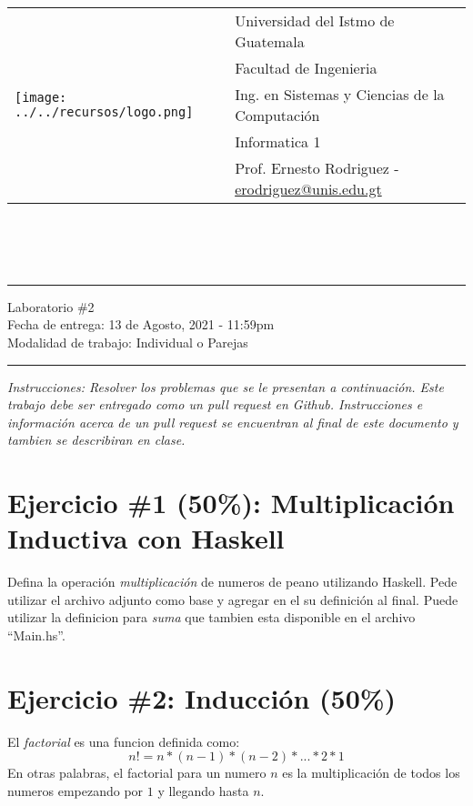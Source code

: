 \documentclass{article}
\newcommand{\horrule}[1]{\rule{\linewidth}{#1}}
\newcommand{\perlscript}[2]{
\begin{itemize}
\item[]
\end{itemize}
}
\begin{document}
\begin{tabular}{l l}
\multirow{5}{*}{\texttt{[image: ../../recursos/logo.png]}} & Universidad del Istmo de Guatemala \\
 & Facultad de Ingenieria \\
 & Ing. en Sistemas y Ciencias de la Computaci\'on \\
 & Informatica 1 \\
 & Prof. Ernesto Rodriguez - \href{mailto:erodriguez@unis.edu.gt}{erodriguez@unis.edu.gt} \\
\end{tabular}
\\\\\\

\begin{center}
        \horrule{0.5pt}
        \huge{Laboratorio \#2} \\
        \large{Fecha de entrega: 13 de Agosto, 2021 - 11:59pm} \\
        \large{Modalidad de trabajo: Individual o Parejas}
        \horrule{1pt}
\end{center}

\emph{Instrucciones: Resolver los problemas que se le presentan a
continuaci\'on. Este trabajo debe ser entregado como un pull request
en Github. Instrucciones e informaci\'on acerca de un pull request
se encuentran al final de este documento y tambien se describiran
en clase.}


\section*{Ejercicio \#1 (50\%): Multiplicaci\'on Inductiva con Haskell}
Defina la operaci\'on \emph{multiplicaci\'on} de numeros de peano
utilizando Haskell. Pede utilizar el archivo adjunto como base
y agregar en el su definici\'on al final. Puede utilizar la
definicion para \emph{suma} que tambien esta disponible en
el archivo ``Main.hs''.

\section*{Ejercicio \#2: Inducci\'on (50\%)}

El \emph{factorial} es una funcion definida como:
\[
n! = n * (n - 1) * (n - 2) * ... * 2 * 1
\]
En otras palabras, el factorial para un numero $n$
es la multiplicaci\'on de todos los numeros empezando
por $1$ y llegando hasta $n$.
\end{document}
